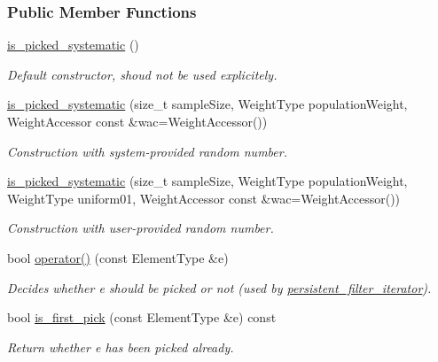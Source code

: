 \subsubsection*{Public Member Functions}
\begin{DoxyCompactItemize}
\item 
\hyperlink{classtrsl_1_1is__picked__systematic_a6e812d5651e0ee441f508c0ab88c692d}{is\_\-picked\_\-systematic} ()
\begin{DoxyCompactList}\small\item\em Default constructor, shoud not be used explicitely. \item\end{DoxyCompactList}\item 
\hyperlink{classtrsl_1_1is__picked__systematic_a74577120b2a697ad3a91f538a844b055}{is\_\-picked\_\-systematic} (size\_\-t sampleSize, WeightType populationWeight, WeightAccessor const \&wac=WeightAccessor())
\begin{DoxyCompactList}\small\item\em Construction with system-\/provided random number. \item\end{DoxyCompactList}\item 
\hyperlink{classtrsl_1_1is__picked__systematic_abc605b982bcf8ff63eedcd95e4d1e64a}{is\_\-picked\_\-systematic} (size\_\-t sampleSize, WeightType populationWeight, WeightType uniform01, WeightAccessor const \&wac=WeightAccessor())
\begin{DoxyCompactList}\small\item\em Construction with user-\/provided random number. \item\end{DoxyCompactList}\item 
bool \hyperlink{classtrsl_1_1is__picked__systematic_a95574c2aeff95ece7389efaa915e5d12}{operator()} (const ElementType \&e)
\begin{DoxyCompactList}\small\item\em Decides whether {\ttfamily e} should be picked or not (used by \hyperlink{classtrsl_1_1persistent__filter__iterator}{persistent\_\-filter\_\-iterator}). \item\end{DoxyCompactList}\item 
bool \hyperlink{classtrsl_1_1is__picked__systematic_a47828e07ba7bc503b503e069e145d68a}{is\_\-first\_\-pick} (const ElementType \&e) const 
\begin{DoxyCompactList}\small\item\em Return whether {\ttfamily e} has been picked already. \item\end{DoxyCompactList}\item 

\end{DoxyCompactItemize}
